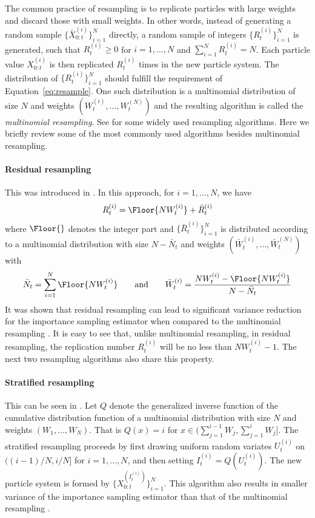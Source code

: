 The common practice of resampling is to replicate particles with large weights and discard those with small weights. In other words, instead of generating a random sample $\{\bar{X}_{0:t}^{(i)}\}_{i=1}^N$ directly, a random sample of integers $\{R_t^{(i)}\}_{i=1}^N$ is generated, such that $R_t^{(i)} \ge 0$ for $i = 1,\dots,N$ and $\sum_{i=1}^N R_t^{(i)} = N$. Each particle value $X_{0:t}^{(i)}$ is then replicated $R_t^{(i)}$ times in the new particle system. The distribution of $\{R_t^{(i)}\}_{i=1}^N$ should fulfill the requirement of Equation~\eqref{eq:resample}. One such distribution is a multinomial distribution of size $N$ and weights $(W_t^{(i)},\dots,W_t^{(N)})$ and the resulting algorithm is called the \emph{multinomial resampling}. See \cite{Douc:2005wa} for some widely used resampling algorithms. Here we briefly review some of the most commonly used algorithms besides multinomial resampling.

\paragraph{Residual resampling}

This was introduced in \cite{Liu:1998iu}. In this approach, for $i = 1,\dots,N$, we have
\begin{equation}
  R_t^{(i)} = \Floor{NW_t^{(i)}} + \bar{R}_t^{(i)}
\end{equation}
where $\Floor{}$ denotes the integer part and $\{\bar{R}_t^{(i)}\}_{i=1}^N$ is distributed according to a multinomial distribution with size $N - \bar{N}_t$ and weights $(\bar{W}_t^{(i)},\dots,\bar{W}_t^{(N)})$ with
\begin{equation*}
  \bar{N}_t = \sum_{i=1}^N\Floor{NW_t^{(i)}} \qquad\text{and}\qquad
  \bar{W}_t^{(i)} = \frac{NW_t^{(i)} - \Floor{NW_t^{(i)}}}{N - \bar{N}_t}
\end{equation*}
It was shown that residual resampling can lead to significant variance reduction for the importance sampling estimator when compared to the multinomial resampling \cite{Douc:2005wa}. It is easy to see that, unlike multinomial resampling, in residual resampling, the replication number $R_t^{(i)}$ will be no less than $NW_t^{(i)} - 1$. The next two resampling algorithms also share this property.

\paragraph{Stratified resampling}

This can be seen in \cite{Kitagawa:1996vx}. Let $Q$ denote the generalized inverse function of the cumulative distribution function of a multinomial distribution with size $N$ and weights $(W_1,\dots,W_N)$. That is $Q(x) = i$ for $x\in(\sum_{j=1}^{i-1}W_j,\sum_{j=1}^iW_j]$. The stratified resampling proceeds by first drawing uniform random variates $U_t^{(i)}$ on $((i-1)/N, i/N]$ for $i = 1,\dots,N$, and then setting $I_t^{(i)} = Q(U_t^{(i)})$. The new particle system is formed by $\{X_{0:t}^{(I_t^{(i)})}\}_{i=1}^N$. This algorithm also results in smaller variance of the importance sampling estimator than that of the multinomial resampling \cite{Douc:2005wa}.


